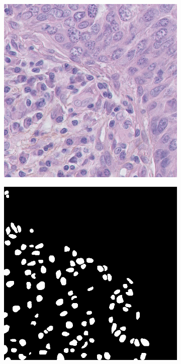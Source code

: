 \begin{figure}[H]
  \centering
  \begin{subfigure}[b]{0.32\textwidth}
    \centering
    \includegraphics[width=\linewidth]{assets/images/for_presentation/image_10_1.png}
    \label{fig:tcga-img}
  \end{subfigure}%
  \hfill
  \begin{subfigure}[b]{0.32\textwidth}
    \centering
    \includegraphics[width=\linewidth]{assets/images/for_presentation/mask_10_1.png}

\end{subfigure}
\end{figure}

